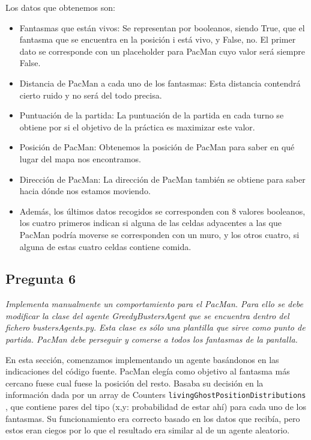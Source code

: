 \documentclass[12pt]{article}
\begin{document}
Los datos que obtenemos son:
\begin{itemize}
    \item Fantasmas que están vivos: Se representan por booleanos, siendo True, que el
    fantasma que se encuentra en la posición i está vivo, y False, no. El primer
    dato se corresponde con un placeholder para PacMan cuyo valor será siempre
    False.
    \item Distancia de PacMan a cada uno de los fantasmas: Esta distancia contendrá
    cierto ruido y no será del todo precisa.
    \item Puntuación de la partida: La puntuación de la partida en cada turno se
    obtiene por si el objetivo de la práctica es maximizar este valor.
    \item Posición de PacMan: Obtenemos la posición de PacMan para saber en qué lugar
    del mapa nos encontramos.
    \item Dirección de PacMan: La dirección de PacMan también se obtiene para saber
    hacia dónde nos estamos moviendo.
    \item Además, los últimos datos recogidos se corresponden con 8 valores booleanos,
    los cuatro primeros indican si alguna de las celdas adyacentes a las que PacMan
    podría moverse se corresponden con un muro, y los otros cuatro, si alguna de
    estas cuatro celdas contiene comida.
\end{itemize}


\newpage
\begin{center}
\subsection{Pregunta 6}

\emph{Implementa manualmente un comportamiento para el PacMan. Para ello se
debe modificar la clase del agente GreedyBustersAgent que se encuentra dentro
del fichero bustersAgents.py. Esta clase es sólo una plantilla que sirve como
punto de partida. PacMan debe perseguir y comerse a todos los fantasmas de la
pantalla.}
\end{center}

En esta sección, comenzamos implementando un agente basándonos en las
indicaciones del código fuente. PacMan elegía como objetivo al fantasma más
cercano fuese cual fuese la posición del resto. Basaba su decisión en la
información dada por un array de Counters \texttt{livingGhostPositionDistributions}
, que contiene pares del tipo (x,y: probabilidad de estar ahí) para cada uno de
los fantasmas. Su funcionamiento era correcto basado en los datos que recibía,
pero estos eran ciegos por lo que el resultado era similar al de un agente
aleatorio.
\end{document}

